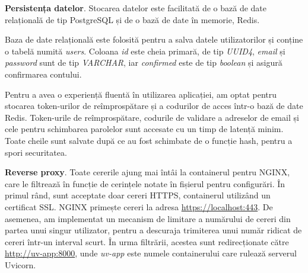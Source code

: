 \textbf{Persistența datelor}. Stocarea datelor este facilitată de o bază de date relațională de tip PostgreSQL și de o bază de date în memorie, Redis.

Baza de date relațională este folosită pentru a salva datele utilizatorilor și conține o tabelă numită \textit{users}. Coloana \textit{id} este cheia primară, de tip \textit{UUID4}, \textit{email} și \textit{password} sunt de tip \textit{VARCHAR}, iar \textit{confirmed} este de tip \textit{boolean} și asigură confirmarea contului.


Pentru a avea o experiență fluentă în utilizarea aplicației, am optat pentru stocarea token-urilor de reîmprospătare și a codurilor de acces într-o bază de date Redis. Token-urile de reîmprospătare, codurile de validare a adreselor de email și cele pentru schimbarea parolelor sunt accesate cu un timp de latență minim. Toate cheile sunt salvate după ce au fost schimbate de o funcție hash, pentru a spori securitatea.

\textbf{Reverse proxy}. Toate cererile ajung mai întâi la containerul pentru NGINX, care le filtrează în funcție de cerințele notate în fișierul pentru configurări. În primul rând, sunt acceptate doar cereri HTTPS, containerul utilizând un certificat SSL. NGINX primește cereri la adresa \url{https://localhost:443}. De asemenea, am implementat un mecanism de limitare a numărului de cereri din partea unui singur utilizator, pentru a descuraja trimiterea unui număr ridicat de cereri într-un interval scurt. În urma filtrării, acestea sunt redirecționate către \url{http://uv-app:8000}, unde \textit{uv-app} este numele containerului care rulează serverul Uvicorn.